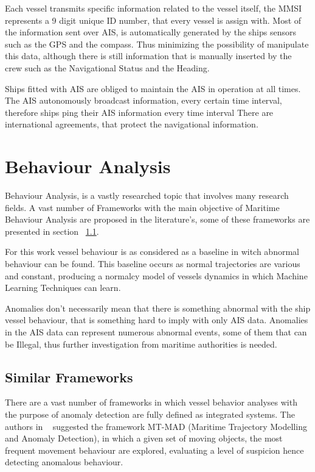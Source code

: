 Each vessel transmits specific information related to the vessel itself, the MMSI represents a 9 digit unique ID number, that every vessel is assign with.
Most of the information sent over AIS, is automatically generated by the ships sensors such as the GPS and the compass. Thus minimizing the possibility of manipulate this data, although there is still information that is manually inserted by the crew such as the Navigational Status and the Heading.

Ships fitted with AIS are obliged to maintain the AIS in operation at all times. The AIS autonomously broadcast information, every certain time interval, therefore ships ping their AIS information every time interval   There are international agreements, that protect the navigational information.


\section{Behaviour Analysis}
Behaviour Analysis, is a vastly researched topic that involves many research fields. A vast number of Frameworks with the main objective of Maritime Behaviour Analysis are proposed in the literature's, some of these frameworks are presented in section ~\ref{section: Similar Frameworks}.

For this work vessel behaviour is as considered as a baseline in witch abnormal behaviour can be found. This baseline occurs as normal trajectories are various and constant, producing a normalcy model of vessels dynamics in which Machine Learning Techniques can learn.

Anomalies don't necessarily mean that there is something abnormal with the ship vessel behaviour, that is something hard to imply with only AIS data. Anomalies in the AIS data can represent numerous abnormal events, some of them that can be Illegal, thus further investigation from maritime authorities is needed. 

\subsection{Similar Frameworks}
\label{section: Similar Frameworks}

There are a vast number of frameworks in which vessel behavior analyses with the purpose of anomaly detection are fully defined as integrated systems. The authors in ~\cite{Lei2016} suggested the framework MT-MAD (Maritime Trajectory Modelling and Anomaly Detection), in which a given set of moving objects, the most frequent movement behaviour are explored, evaluating a level of suspicion hence detecting anomalous behaviour.

